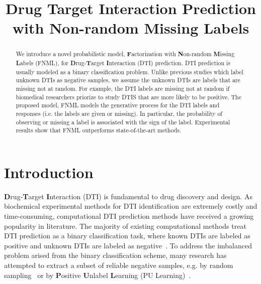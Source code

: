 \documentclass[sigconf,anonymous]{acmart}
\begin{document}
\title{Drug Target Interaction Prediction with Non-random Missing Labels}

\begin{abstract}
We introduce a novel probabilistic model, \textbf{F}actorization with \textbf{N}on-random \textbf{M}issing \textbf{L}abels (FNML), for \textbf{D}rug-\textbf{T}arget \textbf{I}nteraction (DTI) prediction. DTI prediction is usually modeled as a binary classification problem. Unlike previous studies which label unknown DTIs as negative samples, we assume the unknown DTIs are labels that are missing not at random. For example, the DTI labels are missing not at random if biomedical researchers priorize to study DTIS that are more likely to be positive. The proposed model, FNML models the generative process for the DTI labels and responses (i.e. the labels are given or missing). In particular, the probability of observing or missing a label is associated with the sign of the label. Experimental results show that FNML outperforms state-of-the-art methods.
\end{abstract}



\maketitle
\section{Introduction}\label{sec:introduction}
\textbf{D}rug-\textbf{T}arget \textbf{I}nteraction (DTI) is fundamental to drug discovery and design. As biochemical experimental methods for DTI identification are extremely costly and time-consuming, computational DTI prediction methods have received a growing popularity in literature. The majority of existing computational methods treat DTI prediction as a binary classification task, where known DTIs are labeled as positive and unknown DTIs are labeled as negative~\cite{Ding2013Similarity}. To address the imbalanced problem arised from the binary classification scheme, many research has attempted to extract a subset of reliable negative samples, e.g. by random sampling~\cite{Luo2017Network} or by \textbf{P}ositive \textbf{U}nlabel \textbf{L}earning (PU Learning)~\cite{Peng2017Screening}.
\end{document}
